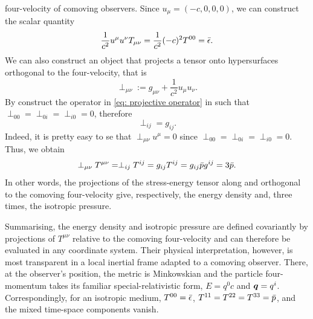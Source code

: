 four-velocity of comoving observers. Since $u_\mu = (-c, 0, 0, 0)$, we can construct the scalar quantity 
\begin{equation}
    \frac{1}{c^2}u^\mu u^\nu T_{\mu\nu} = \frac{1}{c^2}(-c)^2 T^{00} = \bar{\epsilon}.
\end{equation}
We can also construct an object that projects a tensor onto hypersurfaces orthogonal to the four-velocity, that is 
\begin{equation}
\label{eq: projective operator}
    \perp_{\mu\nu} := g_{\mu\nu} + \frac{1}{c^2}u_\mu u_\nu.
\end{equation}
By construct the operator in \eqref{eq: projective operator} in such that $\perp_{00} = \perp_{0i} = \perp_{i0} = 0$, therefore
\begin{equation}
    \perp_{ij} = g_{ij}.
\end{equation}
Indeed, it is pretty easy to se that $\perp_{\mu\nu} u^\mu = 0$ since $\perp_{00} = \perp_{0i} = \perp_{i0} = 0$. Thus, we obtain 
\begin{equation}
    \perp_{\mu\nu}T^{\mu\nu} = \perp_{ij}T^{ij} = g_{ij}T^{ij} = g_{ij}\bar{p}g^{ij} = 3\bar{p}.
\end{equation}
In other words, the projections of the stress-energy tensor along and orthogonal to the comoving four-velocity give, respectively, the energy density and, three times, the isotropic pressure.

Summarising, the energy density and isotropic pressure are defined covariantly by projections of $T^{\mu\nu}$ relative to the comoving four-velocity and can therefore be evaluated in any coordinate system. Their physical interpretation, however, is most transparent in a local inertial frame adapted to a comoving observer. There, at the observer's position, the metric is Minkowskian and the particle four-momentum takes its familiar special-relativistic form, $E = q^0c$ and $\bm{q} = q^i$. Correspondingly, for an isotropic medium, $T^{00} = \bar{\epsilon}$, $T^{11} = T^{22} = T^{33} = \bar{p}$, and the mixed time-space components vanish. 

